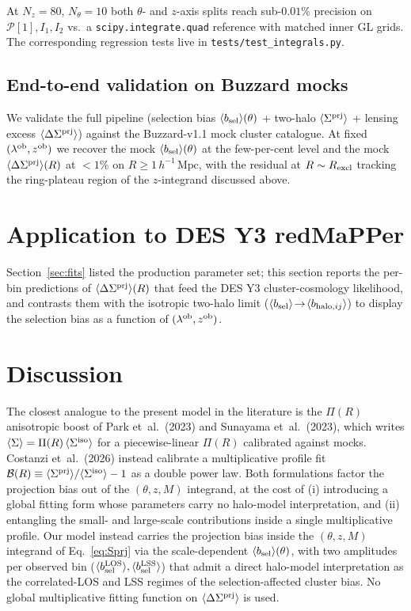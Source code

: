 \documentclass[a4paper, 11pt]{article}
\newcommand{\lob}{\lambda^{\rm ob}}
\newcommand{\zob}{z^{\rm ob}}
\newcommand{\hMpc}{h^{-1}\,\mathrm{Mpc}}
\newcommand{\Pop}{\mathcal{P}}
\newcommand{\bbsel}{\avg{b_{\rm sel}}}
\newcommand{\bbLOS}{\avg{b_{\rm sel}^{\rm LOS}}}
\newcommand{\bbLSS}{\avg{b_{\rm sel}^{\rm LSS}}}
\newcommand{\bbhaloij}{\avg{b_{{\rm halo},ij}}}
\newcommand{\Sprj}{\Sigma^{\rm prj}}
\newcommand{\DSprj}{\Delta\Sigma^{\rm prj}}
\newcommand{\avg}[1]{\langle #1 \rangle}
\begin{document}
At $N_z=80$, $N_\theta=10$ both $\theta$- and $z$-axis splits reach
sub-$0.01\%$ precision on $\Pop[1], I_1, I_2$ vs.\ a
\texttt{scipy.integrate.quad} reference with matched inner GL grids.
The corresponding regression tests live in
\texttt{tests/test\_integrals.py}.

\subsection{End-to-end validation on Buzzard mocks}
\label{sec:tests:buzzard}

We validate the full pipeline (selection bias $\bbsel(\theta)$ +
two-halo $\avg{\Sprj}$ + lensing excess $\avg{\DSprj}$) against the
Buzzard-v1.1 mock cluster catalogue.  At fixed $(\lob,\zob)$ we
recover the mock $\bbsel(\theta)$ at the few-per-cent level and the
mock $\avg{\DSprj}(R)$ at $<1\%$ on $R\ge 1\,\hMpc$, with the residual
at $R\sim R_{\rm excl}$ tracking the ring-plateau region of the
$z$-integrand discussed above.

\section{Application to DES Y3 redMaPPer}
\label{sec:application}

Section~\ref{sec:fits} listed the production parameter set; this
section reports the per-bin predictions of $\avg{\DSprj}(R)$ that feed
the DES Y3 cluster-cosmology likelihood, and contrasts them with the
isotropic two-halo limit ($\bbsel\!\to\!\bbhaloij$) to display the
selection bias as a function of $(\lob,\zob)$.

\section{Discussion}
\label{sec:discussion}

The closest analogue to the present model in the literature is the
$\Pi(R)$ anisotropic boost of Park et~al.\ (2023) and Sunayama
et~al.\ (2023), which writes
$\avg{\Sigma}=\Pi(R)\,\avg{\Sigma^{\rm iso}}$ for a piecewise-linear
$\Pi(R)$ calibrated against mocks.  Costanzi et~al.\ (2026) instead
calibrate a multiplicative profile fit
$\mathcal{B}(R)\equiv\avg{\Sprj}/\avg{\Sigma^{\rm iso}}-1$ as a
double power law.  Both formulations factor the projection bias out of
the $(\theta,z,M)$ integrand, at the cost of (i) introducing a global
fitting form whose parameters carry no halo-model interpretation, and
(ii) entangling the small- and large-scale contributions inside a
single multiplicative profile.  Our model instead carries the
projection bias inside the $(\theta,z,M)$ integrand of
Eq.~\eqref{eq:Sprj} via the scale-dependent $\bbsel(\theta)$, with two
amplitudes per observed bin ($\bbLOS,\bbLSS$) that admit a direct
halo-model interpretation as the correlated-LOS and LSS regimes of
the selection-affected cluster bias.  No global multiplicative fitting
function on $\avg{\DSprj}$ is used.
\end{document}
